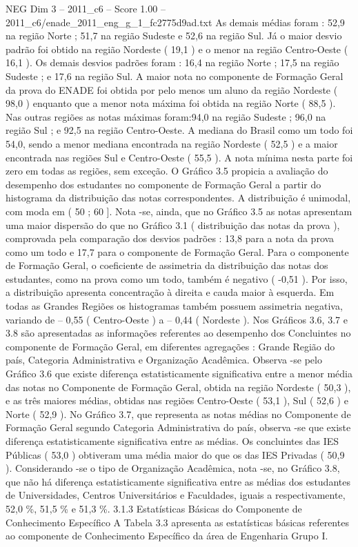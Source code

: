 \begin{textsample}{NEG Dim 3 – 2011\_c6 – Score 1.00 – 2011\_c6/enade\_2011\_eng\_g\_1\_fc2775d9ad.txt}
As demais médias foram : 52,9 na região Norte ; 51,7 na região Sudeste e 52,6 na região Sul.
Já o maior desvio padrão foi obtido na região Nordeste ( 19,1 ) e o menor na região Centro-Oeste ( 16,1 ).
Os demais desvios padrões foram : 16,4 na região Norte ; 17,5 na região Sudeste ; e 17,6 na região Sul.
A maior nota no componente de Formação Geral da prova do ENADE foi obtida por pelo menos um aluno da região Nordeste ( 98,0 ) enquanto que a menor nota máxima foi obtida na região Norte ( 88,5 ).
Nas outras regiões as notas máximas foram:94,0 na região Sudeste ; 96,0 na região Sul ; e 92,5 na região Centro-Oeste.
A mediana do Brasil como um todo foi 54,0, sendo a menor mediana encontrada na região Nordeste ( 52,5 ) e a maior encontrada nas regiões Sul e Centro-Oeste ( 55,5 ).
A nota mínima nesta parte foi zero em todas as regiões, sem exceção.
O Gráfico 3.5 propicia a avaliação do desempenho dos estudantes no componente de Formação Geral a partir do histograma da distribuição das notas correspondentes.
A distribuição é unimodal, com moda em ( 50 ; 60 ].
Nota -se, ainda, que no Gráfico 3.5 as notas apresentam uma maior dispersão do que no Gráfico 3.1 ( distribuição das notas da prova ), comprovada pela comparação dos desvios padrões : 13,8 para a nota da prova como um todo e 17,7 para o componente de Formação Geral.
Para o componente de Formação Geral, o coeficiente de assimetria da distribuição das notas dos estudantes, como na prova como um todo, também é negativo ( -0,51 ).
Por isso, a distribuição apresenta concentração à direita e cauda maior à esquerda.
Em todas as Grandes Regiões os histogramas também possuem assimetria negativa, variando de – 0,55 ( Centro-Oeste ) a – 0,44 ( Nordeste ).
Nos Gráficos 3.6, 3.7 e 3.8 são apresentadas as informações referentes ao desempenho dos Concluintes no componente de Formação Geral, em diferentes agregações : Grande Região do país, Categoria Administrativa e Organização Acadêmica.
Observa -se pelo Gráfico 3.6 que existe diferença estatisticamente significativa entre a menor média das notas no Componente de Formação Geral, obtida na região Nordeste ( 50,3 ), e as três maiores médias, obtidas nas regiões Centro-Oeste ( 53,1 ), Sul ( 52,6 ) e Norte ( 52,9 ).
No Gráfico 3.7, que representa as notas médias no Componente de Formação Geral segundo Categoria Administrativa do país, observa -se que existe diferença estatisticamente significativa entre as médias.
Os concluintes das IES Públicas ( 53,0 ) obtiveram uma média maior do que os das IES Privadas ( 50,9 ).
Considerando -se o tipo de Organização Acadêmica, nota -se, no Gráfico 3.8, que não há diferença estatisticamente significativa entre as médias dos estudantes de Universidades, Centros Universitários e Faculdades, iguais a respectivamente, 52,0 \%, 51,5 \% e 51,3 \%. 3.1.3 Estatísticas Básicas do Componente de Conhecimento Específico A Tabela 3.3 apresenta as estatísticas básicas referentes ao componente de Conhecimento Específico da área de Engenharia Grupo I.

\end{textsample}
